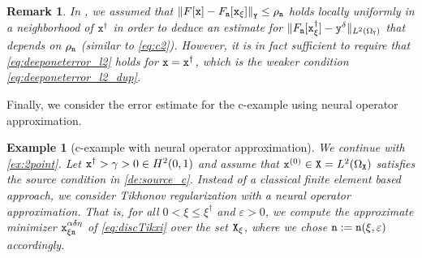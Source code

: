 \documentclass[10pt]{article}
\numberwithin{equation}{section}
\newtheorem{example}[example]{Example}
\newtheorem{remark}[remark]{Remark}
\theoremstyle{nonumberplain}
\newcommand{\norm}[1]{\left\|#1\right\|}
\newcommand{\norms}[1]{\|#1\|}
\newcommand{\ve}{\varepsilon}
\newcommand{\X}{{\tt X}}
\newcommand{\Y}{{\tt Y}}
\newcommand{\y}{{\tt y}}
\newcommand{\n}{{\tt n}}
\newcommand{\x}{{\tt x}}
\newcommand{\xdag}{\x^\dagger}
\begin{document}
\begin{remark}
	In \cite{NeuSch90}, we assumed that $\norm{F[\x]-F_\n[\x_\xi]}_\Y \leq \rho_\n$ holds locally uniformly in a neighborhood of $\xdag$ in order to deduce an estimate for $\norms{F_\n[\xdag_\xi] - \y^\delta}_{L^2(\Omega_\Y)}$ that depends on $\rho_\n$ (similar to \autoref{eq:c2}). However, it is in fact sufficient to require that \autoref{eq:deeponeterror_l2} holds for $\x = \xdag$, which is the weaker condition \autoref{eq:deeponeterror_l2_dup}.
\end{remark}

Finally, we consider the error estimate for the c-example using neural operator approximation. 
\begin{example}[c-example with neural operator approximation] \label{eg:cNN}
We continue with \autoref{ex:2point}. Let $\xdag > \gamma > 0 \in H^2(0,1)$ and assume that $\x^{(0)} \in \X=L^2(\Omega_\X)$ satisfies the source condition in \autoref{de:source_c}. Instead of a classical finite element based approach, we consider Tikhonov regularization with a neural operator approximation.  That is, for all $0 < \xi \leq \xi^\dagger$ and $\ve > 0$, we compute the approximate minimizer $\x_{\xi\n}^{\alpha\delta\eta}$ of \autoref{eq:discTikxi} over the set $\X_\xi$, where we chose $\n := \n(\xi,\ve)$ accordingly.


\end{example}
\end{document}

